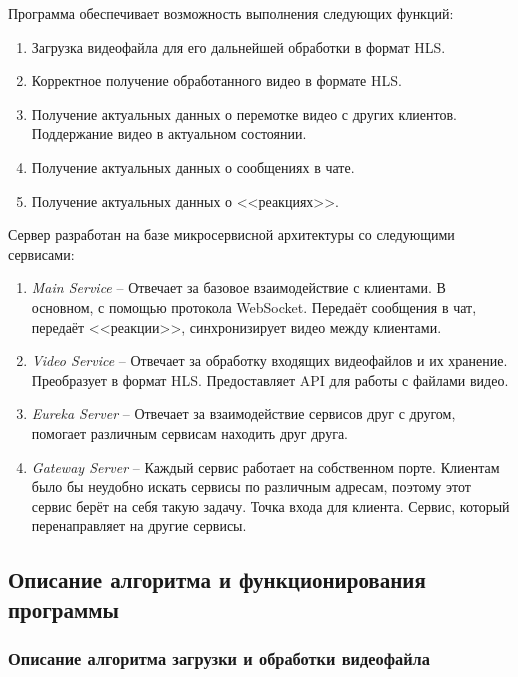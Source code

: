 \documentclass{../includes/TechDoc}
\begin{document}
    Программа обеспечивает возможность выполнения следующих функций:
    \begin{enumerate}
        \item Загрузка видеофайла для его дальнейшей обработки в формат HLS.
        \item Корректное получение обработанного видео в формате HLS.
        \item Получение актуальных данных о перемотке видео с других клиентов.
        Поддержание видео в актуальном состоянии.
        \item Получение актуальных данных о сообщениях в чате.
        \item Получение актуальных данных о <<реакциях>>.
    \end{enumerate}

    Сервер разработан на базе микросервисной архитектуры со следующими сервисами:
    \begin{enumerate}
        \item \emph{Main Service} -- Отвечает за базовое взаимодействие с клиентами.
        В основном, с помощью протокола WebSocket.
        Передаёт сообщения в чат, передаёт <<реакции>>, синхронизирует видео между клиентами.
        \item \emph{Video Service} -- Отвечает за обработку входящих видеофайлов и их хранение.
        Преобразует в формат HLS.
        Предоставляет API для работы с файлами видео.
        \item \emph{Eureka Server} -- Отвечает за взаимодействие сервисов друг с другом, помогает различным сервисам находить друг друга.
        \item \emph{Gateway Server} -- Каждый сервис работает на собственном порте.
        Клиентам было бы неудобно искать сервисы по различным адресам, поэтому этот сервис берёт на себя такую задачу.
        Точка входа для клиента. Сервис, который перенаправляет на другие сервисы.
    \end{enumerate}

    \newpage

    \subsection{Описание алгоритма и функционирования программы}

    \subsubsection{Описание алгоритма загрузки и обработки видеофайла}
\end{document}
